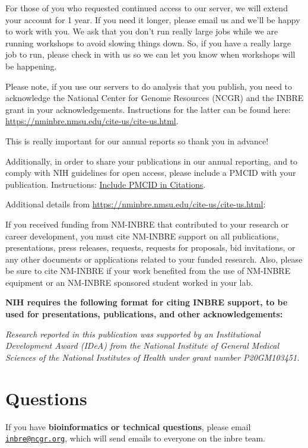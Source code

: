 \documentclass[
]{book}
\begin{document}
For those of you who requested continued access to our server, we will extend your account for 1 year. If you need it longer, please email us and we'll be happy to work with you. We ask that you don't run really large jobs while we are running workshops to avoid slowing things down. So, if you have a really large job to run, please check in with us so we can let you know when workshops will be happening.

Please note, if you use our servers to do analysis that you publish, you need to acknowledge the National Center for Genome Resources (NCGR) and the INBRE grant in your acknowledgements. Instructions for the latter can be found here: \url{https://nminbre.nmsu.edu/cite-us/cite-us.html}.

This is really important for our annual reports so thank you in advance!

Additionally, in order to share your publications in our annual reporting, and to comply with NIH guidelines for open access, please include a PMCID with your publication. Instructions: \href{https://publicaccess.nih.gov/include-pmcid-citations.htm}{Include PMCID in Citations}.

Additional details from \url{https://nminbre.nmsu.edu/cite-us/cite-us.html}:

{If you received funding from NM-INBRE that contributed to your research or career development, you must cite NM-INBRE support on all publications, presentations, press releases, requests, requests for proposals, bid invitations, or any other documents or applications related to your funded research. Also, please be sure to cite NM-INBRE if your work benefited from the use of NM-INBRE equipment or an NM-INBRE sponsored student worked in your lab.}

{\textbf{NIH requires the following format for citing INBRE support, to be used for presentations, publications, and other acknowledgements:}}

{\emph{Research reported in this publication was supported by an Institutional Development Award (IDeA) from the National Institute of General Medical Sciences of the National Institutes of Health under grant number P20GM103451.}}

\hypertarget{questions}{%
\chapter*{Questions}\label{questions}}

If you have \textbf{bioinformatics or technical questions}, please email \href{mailto:inbre@ncgr.org}{\nolinkurl{inbre@ncgr.org}}, which will send emails to everyone on the inbre team.
\end{document}
